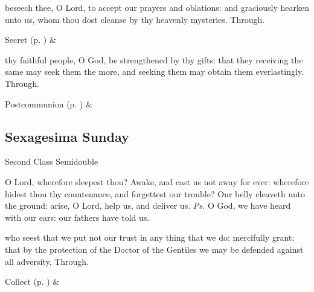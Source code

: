 \clearpage
\secret
{} beseech thee, O Lord, to accept our prayers and oblations: and graciously hearken unto us, whom thou dost cleanse by thy heavenly mysteries. Through.
\begin{rubric}
     Secret  (p. \pageref{SPSaints}) \&  
\end{rubric}
\postcommunion
{} thy faithful people, O God, be strengthened by thy gifts: that they receiving the same may seek them the more, and seeking them may obtain them everlastingly. Through.
\begin{rubric}
     Postcommunion  (p. \pageref{SPSaints}) \&  
\end{rubric}


\subsection{Sexagesima Sunday}
\begin{inhead}
{Second Class Semidouble}
\end{inhead}

\introit
{} O Lord, wherefore sleepest thou? Awake, and cast us not away for ever: wherefore hidest thou thy countenance, and forgettest our trouble? Our belly cleaveth unto the ground: arise, O Lord, help us, and deliver us. \textit{Ps.} O God, we have heard with our ears: our fathers have told us.

\collect
{} who seest that we put not our trust in any thing that we do: mercifully grant; that by the protection of the Doctor of the Gentiles we may be defended against all adversity. Through.

\begin{rubric}
     Collect  (p. \pageref{SPSaints}) \&  
\end{rubric}

